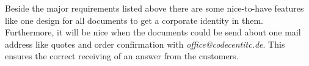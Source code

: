 Beside the major requirements listed above there are some nice-to-have features like one design for all documents to get a corporate identity in them. Furthermore, it will be nice when the documents could be send about one mail address like quotes and order confirmation with \textit{office@codecentitc.de}. This ensures the correct receiving of an answer from the customers. 

